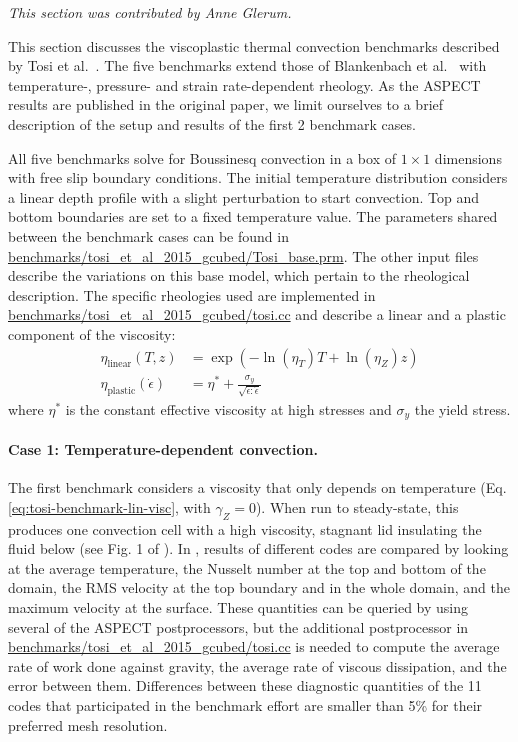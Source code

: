 \documentclass{article}
\newcommand{\aspect}{\textsc{ASPECT}}
\begin{document}
\textit{This section was contributed by Anne Glerum.}

This section discusses the viscoplastic thermal convection benchmarks described by Tosi et al.~\cite{T15}.  The five benchmarks extend those of Blankenbach et al.~\cite{BBC89} with temperature-, pressure- and strain rate-dependent rheology. As the \aspect{} results are published in the original paper, we limit ourselves to a brief description of the setup and results of the first 2 benchmark cases. 

All five benchmarks solve for Boussinesq convection in a box of $1 \times 1$ dimensions with free slip boundary conditions. The initial temperature distribution considers a linear depth profile with a slight perturbation to start convection. Top and bottom boundaries are set to a fixed temperature value. The parameters shared between the benchmark cases can be found in \url{benchmarks/tosi_et_al_2015_gcubed/Tosi_base.prm}. The other input files describe the variations on this base model, which pertain to the rheological description. The specific rheologies used are implemented in \url{benchmarks/tosi_et_al_2015_gcubed/tosi.cc} and describe a linear and a plastic component of the viscosity:
\begin{align}
  \eta_\text{linear}(T,z) &= \exp(-\ln(\eta_T) T + \ln(\eta_Z) z)
  \label{eq:tosi-benchmark-lin-visc} \\
  \eta_\text{plastic}(\dot\epsilon) &= \eta^\ast + \frac{\sigma_y}{\sqrt{\dot\epsilon:\dot\epsilon}}
  \label{eq:tosi-benchmark-plast-visc}
\end{align}
where $\eta^\ast$ is the constant effective viscosity at high stresses and $\sigma_y$ the yield stress.

\paragraph{Case 1: Temperature-dependent convection.}
\label{sec:benchmark-tosi-case-1}

The first benchmark considers a viscosity that only depends on temperature (Eq. \eqref{eq:tosi-benchmark-lin-visc}, with $\gamma_Z=0$). When run to steady-state, this produces one convection cell with a high viscosity, stagnant lid insulating the fluid below (see Fig. 1 of \cite{T15}). In \cite{T15}, results of different codes are compared by looking at the average temperature, the Nusselt number at the top and bottom of the domain, the RMS velocity at the top boundary and in the whole domain, and the maximum velocity at the surface. These quantities can be queried by using several of the \aspect{} postprocessors, but the additional postprocessor in \url{benchmarks/tosi_et_al_2015_gcubed/tosi.cc} is needed to compute the average rate of work done against gravity, the average rate of viscous dissipation, and the error between them. Differences between these diagnostic quantities of the 11 codes that participated in the benchmark effort are smaller than 5\% for their preferred mesh resolution.
\end{document}
